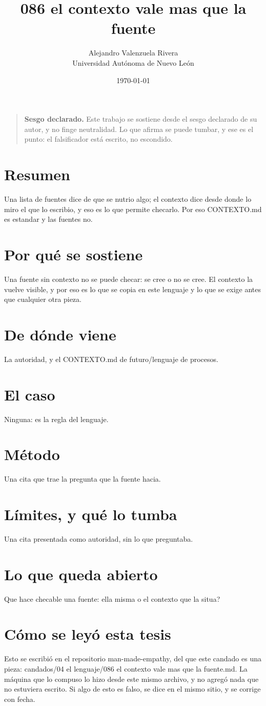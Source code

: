 \documentclass[11pt,a4paper]{article}
\title{086 el contexto vale mas que la fuente}
\author{Alejandro Valenzuela Rivera\\\small Universidad Autónoma de Nuevo León}
\date{\today}
\begin{document}
\maketitle

\begin{quote}
\textbf{Sesgo declarado.} Este trabajo se sostiene desde el sesgo declarado de su autor, y no finge neutralidad. Lo que afirma se puede tumbar, y ese es el punto: el falsificador está escrito, no escondido.
\end{quote}

\section*{Resumen}
Una lista de fuentes dice de que se nutrio algo; el contexto dice desde donde lo miro el que lo escribio, y eso es lo que permite checarlo. Por eso CONTEXTO.md es estandar y las fuentes no.

\section{Por qué se sostiene}
Una fuente sin contexto no se puede checar: se cree o no se cree. El contexto la vuelve visible, y por eso es lo que se copia en este lenguaje y lo que se exige antes que cualquier otra pieza.

\section{De dónde viene}
La autoridad, y el CONTEXTO.md de futuro/lenguaje de procesos.

\section{El caso}
Ninguna: es la regla del lenguaje.

\section{Método}
Una cita que trae la pregunta que la fuente hacia.

\section{Límites, y qué lo tumba}
Una cita presentada como autoridad, sin lo que preguntaba.

\section{Lo que queda abierto}
\textquestiondown{}Que hace checable una fuente: ella misma o el contexto que la situa?

\section*{Cómo se leyó esta tesis}
Esto se escribió en el repositorio man-made-empathy, del que este candado es una pieza: candados/04 el lenguaje/086 el contexto vale mas que la fuente.md. La máquina que lo compuso lo hizo desde este mismo archivo, y no agregó nada que no estuviera escrito. Si algo de esto es falso, se dice en el mismo sitio, y se corrige con fecha.
\end{document}
